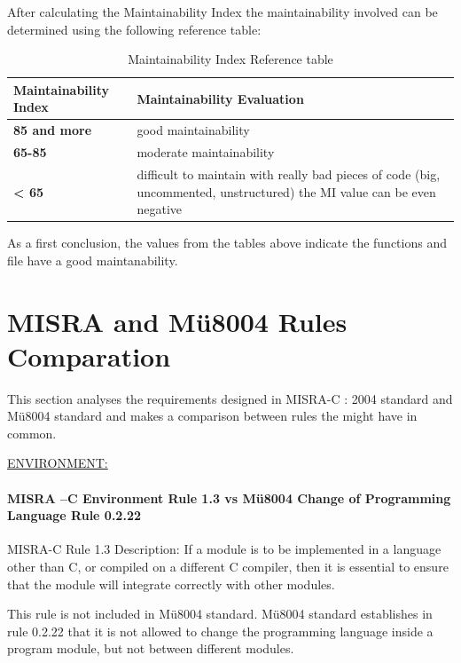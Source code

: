 After calculating the Maintainability Index the maintainability involved can be determined using the following reference table:

{\footnotesize\sffamily\centering
  \begin{longtable}{||p{}|p{}||}
  \caption{Maintainability Index Reference table}\\
    \hline\hline
    \textbf{Maintainability Index} & \textbf{Maintainability Evaluation} \\
    \hline\hline
    \endhead
    \hline\hline
    \endfoot
    \textbf{85 and more}
& good maintainability
    \\
    \hline
    \textbf{65-85}
& moderate maintainability
    \\
    \hline
    \textbf{< 65}
& difficult to maintain
with really bad pieces of code (big, uncommented, unstructured) the MI value can be even negative
    \\
    \hline
\end{longtable}}

As a first conclusion, the values from the tables above indicate the functions and file have a good maintanability.

\section{MISRA and Mü8004 Rules Comparation}
This section analyses the requirements designed in MISRA-C : 2004 standard and Mü8004 standard and makes a comparison between rules the might have in common.

\begin{center}
\textsc{\underline{ENVIRONMENT:}}
\end{center}

\paragraph{MISRA –C Environment Rule 1.3 vs Mü8004 Change of Programming Language Rule 0.2.22}
MISRA-C Rule 1.3 Description: If a module is to be implemented in a language other than C, or compiled on a different C compiler, then it is essential to ensure that the module will integrate correctly with other modules.

This rule is not included in Mü8004 standard. Mü8004 standard establishes in rule 0.2.22 that it is not allowed to change the programming language inside a program module, but not between different modules.

